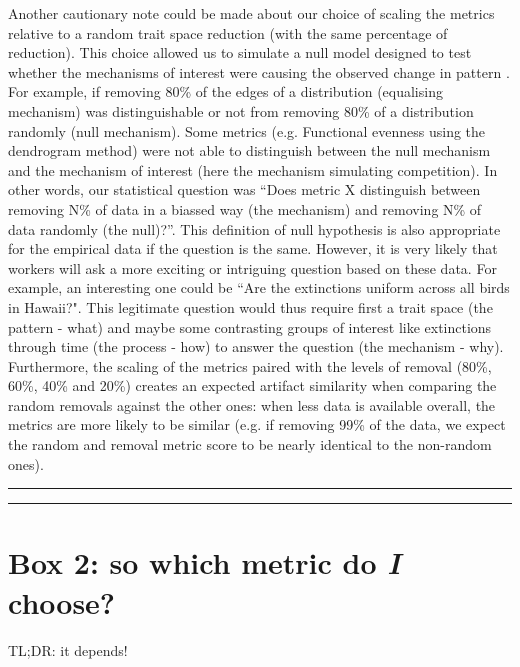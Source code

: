 \documentclass[12pt,letterpaper]{article}
\begin{document}
Another cautionary note could be made about our choice of scaling the metrics relative to a random trait space reduction (with the same percentage of reduction).
This choice allowed us to simulate a null model designed to test whether the mechanisms of interest were causing the observed change in pattern \citep{bausman2018modeling}.
For example, if removing 80\% of the edges of a distribution (equalising mechanism) was distinguishable or not from removing 80\% of a distribution randomly (null mechanism).
Some metrics (e.g. Functional evenness using the dendrogram method) were not able to distinguish between the null mechanism and the mechanism of interest (here the mechanism simulating competition).
In other words, our statistical question was ``Does metric X distinguish between removing N\% of data in a biassed way (the mechanism) and removing N\% of data randomly (the null)?''.
This definition of null hypothesis is also appropriate for the empirical data if the question is the same.
However, it is very likely that workers will ask a more exciting or intriguing question based on these data.
For example, an interesting one could be ``Are the extinctions uniform across all birds in Hawaii?".
This legitimate question would thus require first a trait space (the pattern - what) and maybe some contrasting groups of interest like extinctions through time (the process - how) to answer the question (the mechanism - why).
Furthermore, the scaling of the metrics paired with the levels of removal (80\%, 60\%, 40\% and 20\%) creates an expected artifact similarity when comparing the random removals against the other ones: when less data is available overall, the metrics are more likely to be similar (e.g. if removing 99\% of the data, we expect the random and removal metric score to be nearly identical to the non-random ones).


\bigskip
\bigskip
\hrule
\hrule

\section*{Box 2: so which metric do \textit{I} choose?}

TL;DR: it depends!
\end{document}
